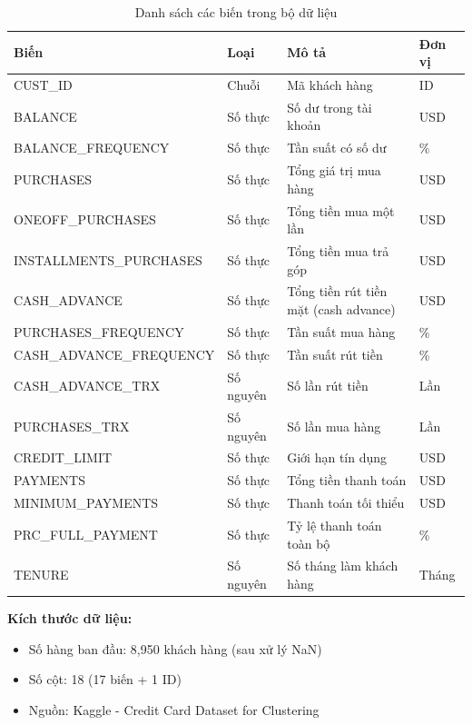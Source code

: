 \begin{table}[H]
\centering
\caption{Danh sách các biến trong bộ dữ liệu}
\small
\begin{tabular}{|p{4.5cm}|p{2cm}|p{6cm}|p{1.5cm}|}
\hline
\textbf{Biến} & \textbf{Loại} & \textbf{Mô tả} & \textbf{Đơn vị} \\
\hline
CUST\_ID & Chuỗi & Mã khách hàng & ID \\
\hline
BALANCE & Số thực & Số dư trong tài khoản & USD \\
\hline
BALANCE\_FREQUENCY & Số thực & Tần suất có số dư & \% \\
\hline
PURCHASES & Số thực & Tổng giá trị mua hàng & USD \\
\hline
ONEOFF\_PURCHASES & Số thực & Tổng tiền mua một lần & USD \\
\hline
INSTALLMENTS\_PURCHASES & Số thực & Tổng tiền mua trả góp & USD \\
\hline
CASH\_ADVANCE & Số thực & Tổng tiền rút tiền mặt (cash advance) & USD \\
\hline
PURCHASES\_FREQUENCY & Số thực & Tần suất mua hàng & \% \\
\hline
CASH\_ADVANCE\_FREQUENCY & Số thực & Tần suất rút tiền & \% \\
\hline
CASH\_ADVANCE\_TRX & Số nguyên & Số lần rút tiền & Lần \\
\hline
PURCHASES\_TRX & Số nguyên & Số lần mua hàng & Lần \\
\hline
CREDIT\_LIMIT & Số thực & Giới hạn tín dụng & USD \\
\hline
PAYMENTS & Số thực & Tổng tiền thanh toán & USD \\
\hline
MINIMUM\_PAYMENTS & Số thực & Thanh toán tối thiểu & USD \\
\hline
PRC\_FULL\_PAYMENT & Số thực & Tỷ lệ thanh toán toàn bộ & \% \\
\hline
TENURE & Số nguyên & Số tháng làm khách hàng & Tháng \\
\hline
\end{tabular}
\label{tab:variables}
\end{table}

\textbf{Kích thước dữ liệu:}
\begin{itemize}
    \item Số hàng ban đầu: 8,950 khách hàng (sau xử lý NaN)
    \item Số cột: 18 (17 biến + 1 ID)
    \item Nguồn: Kaggle - Credit Card Dataset for Clustering
\end{itemize}

